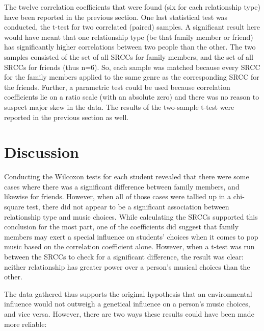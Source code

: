 \documentclass[12pt]{report}
\begin{document}
The twelve correlation coefficients that were found (six for each relationship type) have been reported in the previous section. One last statistical test was conducted, the t-test for two correlated (paired) samples. A significant result here would have meant that one relationship type (be that family member or friend) has significantly higher correlations between two people than the other. The two samples consisted of the set of all SRCCs for family members, and the set of all SRCCs for friends (thus n=6). So, each sample was matched because every SRCC for the family members applied to the same genre as the corresponding SRCC for the friends. Further, a parametric test could be used because correlation coefficients lie on a ratio scale (with an absolute zero) and there was no reason to suspect major skew in the data. The results of the two-sample t-test were reported in the previous section as well.

\chapter*{Discussion}
Conducting the Wilcoxon tests for each student revealed that there were some cases where there was a significant difference between family members, and likewise for friends. However, when all of those cases were tallied up in a chi-square test, there did not appear to be a significant association between relationship type and music choices. While calculating the SRCCs supported this conclusion for the most part, one of the coefficients did suggest that family members may exert a special influence on students' choices when it comes to pop music based on the correlation coefficient alone. However, when a t-test was run between the SRCCs to check for a significant difference, the result was clear: neither relationship has greater power over a person's musical choices than the other.

The data gathered thus supports the original hypothesis that an environmental influence would not outweigh a genetical influence on a person's music choices, and vice versa. However, there are two ways these results could have been made more reliable:
\end{document}
